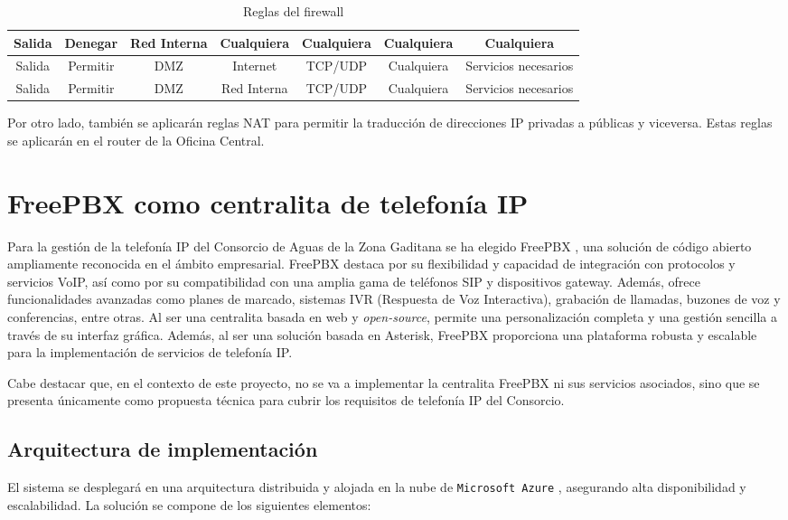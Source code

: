 \begin{table}[H]
{\begin{tabular}{|c|c|c|c|c|c|c|}
			Salida         & Denegar         & Red Interna        & Cualquiera          & Cualquiera         & Cualquiera             & Cualquiera              \\ \hline
			Salida         & Permitir        & DMZ                & Internet            & TCP/UDP            & Cualquiera             & Servicios necesarios    \\ \hline
			Salida         & Permitir        & DMZ                & Red Interna         & TCP/UDP            & Cualquiera             & Servicios necesarios    \\ \hline
		\end{tabular}%
	}
	\caption{Reglas del firewall}
	\label{tab:reglas_firewall}
\end{table}

Por otro lado, también se aplicarán reglas NAT para permitir la traducción de direcciones IP privadas a públicas y viceversa. Estas reglas se aplicarán en el router de la Oficina Central.

\section{FreePBX como centralita de telefonía IP}
Para la gestión de la telefonía IP del Consorcio de Aguas de la Zona Gaditana se ha elegido FreePBX \cite{freepbx_what_is}, una solución de código abierto ampliamente reconocida en el ámbito empresarial. FreePBX destaca por su flexibilidad y capacidad de integración con protocolos y servicios VoIP, así como por su compatibilidad con una amplia gama de teléfonos SIP y dispositivos gateway. Además, ofrece funcionalidades avanzadas como planes de marcado, sistemas IVR (Respuesta de Voz Interactiva), grabación de llamadas, buzones de voz y conferencias, entre otras. Al ser
una centralita basada en web y \textit{open-source}, permite una personalización completa y una gestión sencilla a través de su interfaz gráfica. Además, al ser una solución basada en Asterisk, FreePBX proporciona una plataforma robusta y escalable para la implementación de servicios de telefonía IP.

\vspace{0.5cm}
Cabe destacar que, en el contexto de este proyecto, no se va a implementar la centralita FreePBX ni sus servicios asociados, sino que se presenta únicamente como propuesta técnica para cubrir los requisitos de telefonía IP del Consorcio.

\subsection{Arquitectura de implementación}
El sistema se desplegará en una arquitectura distribuida y alojada en la nube de \texttt{Microsoft Azure} \cite{azure}, asegurando alta disponibilidad y escalabilidad. La solución se compone de los siguientes elementos:

